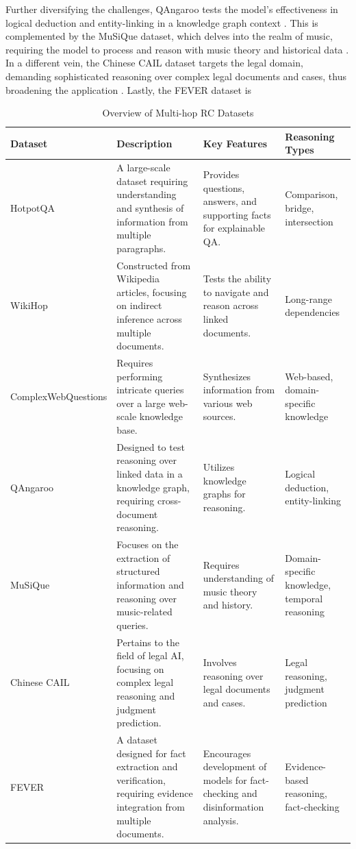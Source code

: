 \documentclass[sigplan,screen,nonacm]{acmart}
\begin{document}
Further diversifying the challenges, QAngaroo tests the model's effectiveness in logical deduction and entity-linking in a knowledge graph context \cite{RN115}. This is complemented by the MuSiQue dataset, which delves into the realm of music, 
requiring the model to process and reason with music theory and historical data \cite{TN167}. In a different vein, the Chinese CAIL dataset targets the legal domain, demanding sophisticated reasoning over complex legal documents and cases, thus broadening the application \cite{RN301}. 
Lastly, the FEVER dataset is 

\begin{table} 
  \centering
  \caption{Overview of Multi-hop RC Datasets}

  \begin{tabular}{|p{4cm}|p{4cm}|p{4cm}|p{4cm}|}
  \hline
  \textbf{Dataset} & \textbf{Description} & \textbf{Key Features} & \textbf{Reasoning Types} \\ \hline
  HotpotQA \cite{RN116} & A large-scale dataset requiring understanding and synthesis of information from multiple paragraphs. & Provides questions, answers, and supporting facts for explainable QA. & Comparison, bridge, intersection \\ \hline
  WikiHop \cite{RN115} & Constructed from Wikipedia articles, focusing on indirect inference across multiple documents. & Tests the ability to navigate and reason across linked documents. & Long-range dependencies \\ \hline
  ComplexWebQuestions \cite{RN104} & Requires performing intricate queries over a large web-scale knowledge base. & Synthesizes information from various web sources. & Web-based, domain-specific knowledge \\ \hline
  QAngaroo \cite{RN115} & Designed to test reasoning over linked data in a knowledge graph, requiring cross-document reasoning. & Utilizes knowledge graphs for reasoning. & Logical deduction, entity-linking \\ \hline
  MuSiQue \cite{RN167} & Focuses on the extraction of structured information and reasoning over music-related queries. & Requires understanding of music theory and history. & Domain-specific knowledge, temporal reasoning \\ \hline
  Chinese CAIL \cite{RN301} & Pertains to the field of legal AI, focusing on complex legal reasoning and judgment prediction. & Involves reasoning over legal documents and cases. & Legal reasoning, judgment prediction \\ \hline
  FEVER \cite{RN300} & A dataset designed for fact extraction and verification, requiring evidence integration from multiple documents. & Encourages development of models for fact-checking and disinformation analysis. & Evidence-based reasoning, fact-checking \\ \hline
  \end{tabular}
  
  \label{table:multihop_datasets}
  \end{table}
\end{document}
